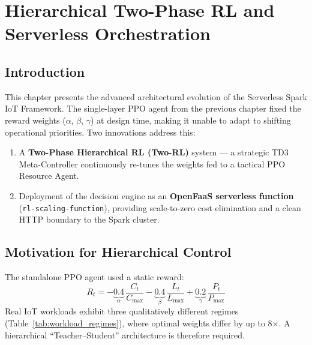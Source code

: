 \chapter{Hierarchical Two-Phase RL and Serverless Orchestration}
\label{chap:two_phase_rl_openfaas}

\section{Introduction}
This chapter presents the advanced architectural evolution of the Serverless Spark IoT
Framework. The single-layer PPO agent from the previous chapter fixed the reward weights
($\alpha$, $\beta$, $\gamma$) at design time, making it unable to adapt to shifting
operational priorities. Two innovations address this:
\begin{enumerate}
  \item A \textbf{Two-Phase Hierarchical RL (Two-RL)} system — a strategic TD3
        Meta-Controller continuously re-tunes the weights fed to a tactical PPO
        Resource Agent.
  \item Deployment of the decision engine as an \textbf{OpenFaaS serverless function}
        (\texttt{rl-scaling-function}), providing scale-to-zero cost elimination and a
        clean HTTP boundary to the Spark cluster.
\end{enumerate}

\section{Motivation for Hierarchical Control}
\label{sec:motivation_hier}
The standalone PPO agent used a static reward:
\[
  R_t = -\underbrace{0.4}_{\alpha}\,\frac{C_t}{C_{\max}}
        - \underbrace{0.4}_{\beta}\,\frac{L_t}{L_{\max}}
        + \underbrace{0.2}_{\gamma}\,\frac{P_t}{P_{\max}}
\]
Real IoT workloads exhibit three qualitatively different regimes (Table~\ref{tab:workload_regimes}),
where optimal weights differ by up to 8$\times$. A hierarchical ``Teacher–Student''
architecture is therefore required.


